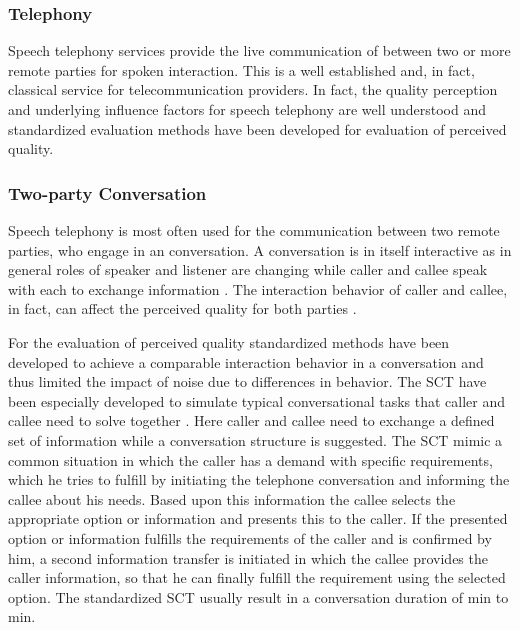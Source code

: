 
\subsubsection*{Telephony}
Speech telephony services provide the live communication of between two or more remote parties for spoken interaction.
This is a well established and, in fact, classical service for telecommunication providers.
In fact, the quality perception and underlying influence factors for speech telephony are well understood and standardized evaluation methods have been developed for evaluation of perceived quality.

\subsubsection*{Two-party Conversation}
Speech telephony is most often used for the communication between two remote parties, who engage in an conversation.
A conversation is in itself interactive as in general roles of speaker and listener are changing while caller and callee speak with each to exchange information \citet[\eg,][]{hopper_telephone_2002}.%
The interaction behavior of caller and callee, in fact, can affect the perceived quality for both parties \citep[\cf,][]{schoenenberg_why_2014}.

For the evaluation of perceived quality standardized methods have been developed to achieve a comparable interaction behavior in a conversation and thus limited the impact of noise due to differences in behavior.
The \acf{SCT} have been especially developed to simulate typical conversational tasks that caller and callee need to solve together \cite[\cf,][p. 76]{moller_assessment_2000}.
Here caller and callee need to exchange a defined set of information while a conversation structure is suggested.
The \acs{SCT} mimic a common situation in which the caller has a demand with specific requirements, which he tries to fulfill by initiating the telephone conversation and informing the callee about his needs.
Based upon this information the callee selects the appropriate option or information and presents this to the caller.
If the presented option or information fulfills the requirements of the caller and is confirmed by him, a second information transfer is initiated in which the callee provides the caller information, so that he can finally fulfill the requirement using the selected option.
The standardized \acs{SCT} \citep{itu-t_p.805:_2007} usually result in a conversation duration of \unit[3]{min} to \unit[7]{min}.

